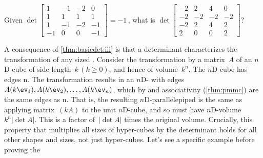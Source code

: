 \begin{activity}\sloppy
Given
\(\det\begin{bmatrix} 1&-1&-2&0
\\1&1&1&1
\\1&-1&-2&-1
\\-1&0&0&-1 \end{bmatrix}=-1\)\,,
what is 
\(\det\begin{bmatrix} -2&2&4&0
\\-2&-2&-2&-2
\\-2&2&4&2
\\2&0&0&2 \end{bmatrix}\)?
\end{activity}


A consequence of \cref{thm:basicdet:iii} is that a determinant characterizes the transformation of any sized . 
Consider the transformation by a matrix~\(A\) of an $n$D-cube of side length~\(k\,(k\geq0)\), and hence of volume~\(k^n\).
The $n$D-cube has edges n.
The transformation results in an $n$D- with edges \(A(k\ev_1),A(k\ev_2),\ldots,A(k\ev_n)\), which by  and associativity (\cref{thm:pmmc}) are the same edges as n.
That is, the resulting $n$D-parallelepiped is the same as applying matrix~\((kA)\) to the unit $n$D-cube, and so must have $n$D-volume~\(k^n|\det A|\).
This is a factor of~\(|\det A|\) times the original volume.
Crucially, this property that  multiplies all sizes of hyper-cubes by the determinant holds for all other shapes and sizes, not just hyper-cubes.
Let's see a specific example before proving the 

